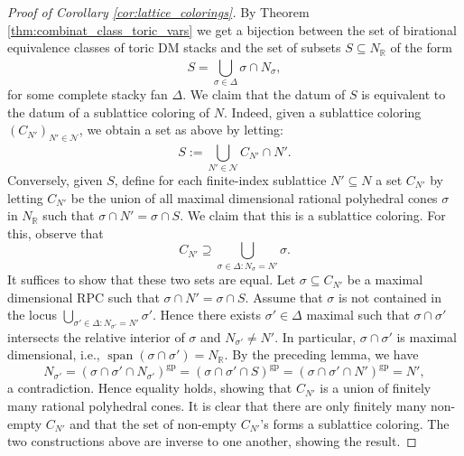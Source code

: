 \documentclass[11pt]{amsart}
\theoremstyle{definition}
\theoremstyle{remark}
\DeclareMathOperator{\Span}{span}
\def\gp{\mathrm{gp}}
\begin{document}
\begin{proof}[Proof of Corollary \ref{cor:lattice_colorings}]
	By Theorem \ref{thm:combinat_class_toric_vars}
	we get a bijection between the set of birational equivalence classes of toric
	DM stacks and the set of subsets
	$S\subseteq N_{\mathbb{R}}$ of the form
	$$S=\bigcup_{\sigma\in \Delta}^{}\sigma\cap N_{\sigma},$$
	for some complete stacky fan $\Delta$. We claim that the
	datum of $S$ is equivalent to the datum of a sublattice
	coloring of $N$. Indeed, given a sublattice coloring
	$(C_{N'})_{N'\in \mathcal{N}}$, we obtain a set as above
	by letting:
	$$S:=\bigcup_{N'\in \mathcal{N}}^{}C_{N'}\cap N'.$$
	Conversely, given $S$, define for each finite-index
	sublattice $N'\subseteq N$ a set $C_{N'}$ by letting
	$C_{N'}$ be the union of all maximal dimensional rational
	polyhedral cones $\sigma$ in $N_{\mathbb{R}}$ such that
	$\sigma\cap N'=\sigma\cap S$. We claim that this is a
	sublattice coloring. For this, observe that
	$$C_{N'}\supseteq \bigcup_{\sigma\in \Delta:N_{\sigma}=N'}\sigma.$$
	It suffices to show that these two sets are equal.
	Let $\sigma\subseteq C_{N'}$ be a maximal dimensional RPC
	such that $\sigma\cap N'=\sigma\cap S$. Assume that
	$\sigma$ is not contained in the locus $\bigcup_{\sigma'\in \Delta:N_{\sigma'}=N'}\sigma'$.
	Hence there exists $\sigma'\in \Delta$ maximal such that
	$\sigma\cap \sigma'$ intersects the relative interior of $\sigma$
	and $N_{\sigma'}\neq N'$. In particular, $\sigma\cap \sigma'$ is maximal dimensional,
	i.e., $\Span(\sigma\cap \sigma')=N_{\mathbb{R}}$. By the preceding lemma, we have
	$$N_{\sigma'}=(\sigma\cap \sigma'\cap N_{\sigma'})^{\gp}=(\sigma\cap \sigma'\cap S)^{\gp}=(\sigma\cap \sigma'\cap N')^{\gp}=N',$$
	a contradiction. Hence equality holds, showing that
	$C_{N'}$ is a union of finitely many rational polyhedral cones.
	It is clear that there are only finitely many non-empty
	$C_{N'}$ and that the set of non-empty $C_{N'}$'s forms
	a sublattice coloring. The two constructions above are inverse
	to one another, showing the result.
\end{proof}




\end{document}
